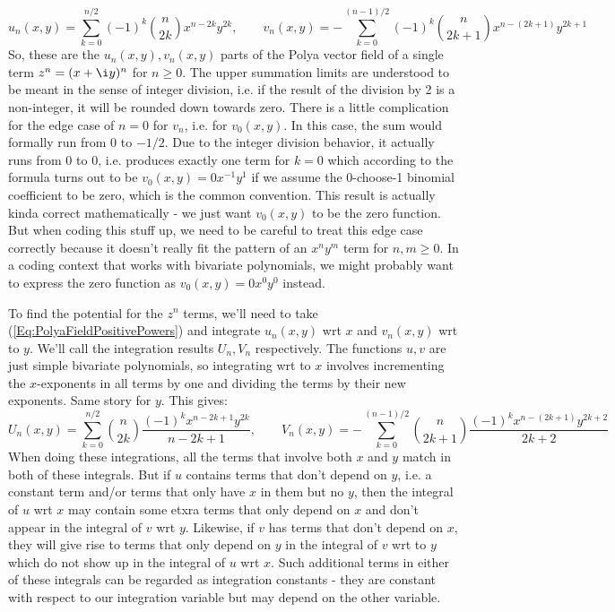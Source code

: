 \documentclass[12pt]{article}
\begin{document}
\begin{equation}
\label{Eq:PolyaFieldPositivePowers}
\boxed{		
	u_n(x,y) = \sum_{k=0}^{n/2} (-1)^k \binom{n}{2 k} x^{n-2k} y^{2k}
	,\qquad
	v_n(x,y) = -\sum_{k=0}^{(n-1)/2} (-1)^k \binom{n}{2k+1} x^{n-(2k+1)} y^{2k+1}
}
\end{equation}
So, these are the $u_n(x,y), v_n(x,y)$ parts of the Polya vector field of a single term $z^n = (x + \i y)^n$ for $n \geq 0$. The upper summation limits are understood to be meant in the sense of integer division, i.e. if the result of the division by 2 is a non-integer, it will be rounded down towards zero. There is a little complication for the edge case of $n=0$ for $v_n$, i.e. for $v_0(x,y)$. In this case, the sum would formally run from $0$ to $-1/2$. Due to the integer division behavior, it actually runs from $0$ to $0$, i.e. produces exactly one term for $k=0$ which according to the formula turns out to be $v_0(x,y) = 0 x^{-1} y^1$ if we assume the 0-choose-1 binomial coefficient to be zero, which is the common convention. This result is actually kinda correct mathematically - we just want $v_0(x,y)$ to be the zero function. But when coding this stuff up, we need to be careful to treat this edge case correctly because it doesn't really fit the pattern of an $x^n y^m$ term for $n,m \geq 0$. In a coding context that works with bivariate polynomials, we might probably want to express the zero function as $v_0(x,y) = 0 x^0 y^0$ instead.

\medskip
To find the potential for the $z^n$ terms, we'll need to take (\ref{Eq:PolyaFieldPositivePowers}) and integrate $u_n(x,y)$ wrt $x$ and $v_n(x,y)$ wrt to $y$. We'll call the integration results $U_n, V_n$ respectively. The functions $u,v$ are just simple bivariate polynomials, so integrating wrt to $x$ involves incrementing the $x$-exponents in all terms by one and dividing the terms by their new exponents. Same story for $y$. This gives:
\begin{equation}
U_n(x,y) = \sum_{k=0}^{n/2} \binom{n}{2 k} \frac{(-1)^k x^{n-2k+1} y^{2k}}{n-2k+1}
,\qquad
V_n(x,y) = -\sum_{k=0}^{(n-1)/2} \binom{n}{2k+1} \frac{(-1)^k x^{n-(2k+1)} y^{2k+2}}{2k+2}
\end{equation}
When doing these integrations, all the terms that involve both $x$ and $y$ match in both of these integrals. But if $u$ contains terms that don't depend on $y$, i.e. a constant term and/or terms that only have $x$ in them but no $y$, then the integral of $u$ wrt $x$ may contain some etxra terms that only depend on $x$ and don't appear in the integral of $v$ wrt $y$. Likewise, if $v$ has terms that don't depend on $x$, they will give rise to terms that only depend on $y$ in the integral of $v$ wrt to $y$ which do not show up in the integral of $u$ wrt $x$. Such additional terms in either of these integrals can be regarded as integration constants - they are constant with respect to our integration variable but may depend on the other variable.
\end{document}
